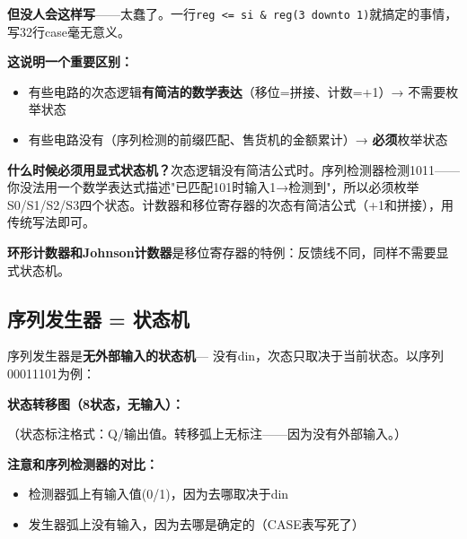 \textbf{但没人会这样写}——太蠢了。一行\texttt{reg <= si \& reg(3 downto 1)}就搞定的事情，写32行case毫无意义。

\textbf{这说明一个重要区别：}
\begin{itemize}
  \item 有些电路的次态逻辑\textbf{有简洁的数学表达}（移位=拼接、计数=+1）→ 不需要枚举状态
  \item 有些电路没有（序列检测的前缀匹配、售货机的金额累计）→ \textbf{必须}枚举状态
\end{itemize}

\textbf{什么时候必须用显式状态机？}次态逻辑没有简洁公式时。序列检测器检测1011——你没法用一个数学表达式描述"已匹配101时输入1→检测到"，所以必须枚举S0/S1/S2/S3四个状态。计数器和移位寄存器的次态有简洁公式（+1和拼接），用传统写法即可。

\textbf{环形计数器和Johnson计数器}是移位寄存器的特例：反馈线不同，同样不需要显式状态机。

\subsection{序列发生器 = 状态机}

序列发生器是\textbf{无外部输入的状态机}— 没有din，次态只取决于当前状态。以序列00011101为例：

\textbf{状态转移图（8状态，无输入）：}

\begin{center}
\end{center}
（状态标注格式：Q/输出值。转移弧上无标注——因为没有外部输入。）

\textbf{注意和序列检测器的对比：}
\begin{itemize}
  \item 检测器弧上有输入值(0/1)，因为去哪取决于din
  \item 发生器弧上没有输入，因为去哪是确定的（CASE表写死了）
\end{itemize}

